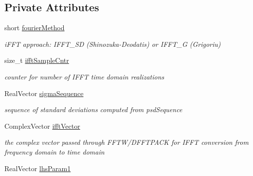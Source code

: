 \subsection*{Private Attributes}
\begin{DoxyCompactItemize}
\item 
short \hyperlink{classPecos_1_1FourierInverseTransformation_a2bdf8e4836528f537931c346251891c0}{fourier\+Method}\label{classPecos_1_1FourierInverseTransformation_a2bdf8e4836528f537931c346251891c0}

\begin{DoxyCompactList}\small\item\em i\+F\+FT approach\+: I\+F\+F\+T\+\_\+\+SD (Shinozuka-\/\+Deodatis) or I\+F\+F\+T\+\_\+G (Grigoriu) \end{DoxyCompactList}\item 
size\+\_\+t \hyperlink{classPecos_1_1FourierInverseTransformation_a1b5d0d6b615c21f4d3accdc976c69290}{ifft\+Sample\+Cntr}\label{classPecos_1_1FourierInverseTransformation_a1b5d0d6b615c21f4d3accdc976c69290}

\begin{DoxyCompactList}\small\item\em counter for number of I\+F\+FT time domain realizations \end{DoxyCompactList}\item 
Real\+Vector \hyperlink{classPecos_1_1FourierInverseTransformation_a0a44b0cf49c6dbeb0ad7829dc7ae869e}{sigma\+Sequence}\label{classPecos_1_1FourierInverseTransformation_a0a44b0cf49c6dbeb0ad7829dc7ae869e}

\begin{DoxyCompactList}\small\item\em sequence of standard deviations computed from psd\+Sequence \end{DoxyCompactList}\item 
Complex\+Vector \hyperlink{classPecos_1_1FourierInverseTransformation_af39d7ad1911f4e0b35f223ea3891312f}{ifft\+Vector}\label{classPecos_1_1FourierInverseTransformation_af39d7ad1911f4e0b35f223ea3891312f}

\begin{DoxyCompactList}\small\item\em the complex vector passed through F\+F\+T\+W/\+D\+F\+F\+T\+P\+A\+CK for I\+F\+FT conversion from frequency domain to time domain \end{DoxyCompactList}\item 
Real\+Vector \hyperlink{classPecos_1_1FourierInverseTransformation_abf42c3f3fb4b853dccd6fc8702f1a45a}{lhs\+Param1}\label{classPecos_1_1FourierInverseTransformation_abf42c3f3fb4b853dccd6fc8702f1a45a}


\end{DoxyCompactItemize}
